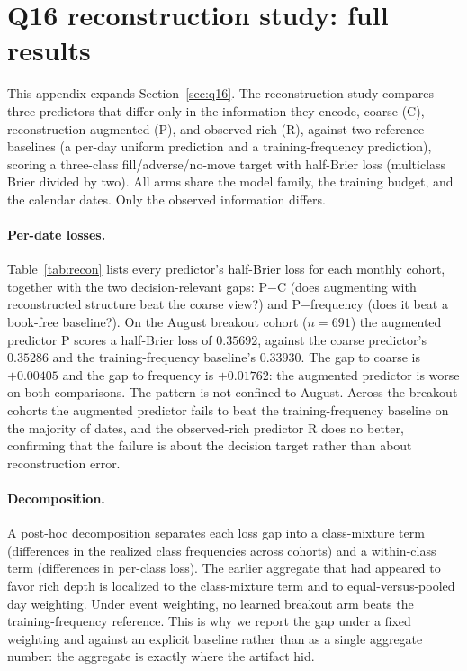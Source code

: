 \section{Q16 reconstruction study: full results}
\label{app:recon}

This appendix expands Section~\ref{sec:q16}. The reconstruction study compares three
predictors that differ only in the information they encode, coarse (C), reconstruction
augmented (P), and observed rich (R), against two reference baselines (a per-day uniform
prediction and a training-frequency prediction), scoring a three-class fill/adverse/no-move
target with half-Brier loss (multiclass Brier divided by two). All arms share the model
family, the training budget, and the calendar dates. Only the observed information differs.

\paragraph{Per-date losses.} Table~\ref{tab:recon} lists every predictor's half-Brier loss
for each monthly cohort, together with the two decision-relevant gaps: P$-$C (does
augmenting with reconstructed structure beat the coarse view?) and P$-$frequency (does it
beat a book-free baseline?). On the August breakout cohort ($n=691$) the augmented predictor P
scores a half-Brier loss of $0.35692$, against the coarse predictor's $0.35286$ and the
training-frequency baseline's $0.33930$. The gap to coarse is $+0.00405$ and the gap to
frequency is $+0.01762$: the augmented predictor is worse on both comparisons. The pattern is not confined to August. Across the
breakout cohorts the augmented predictor fails to beat the training-frequency baseline on
the majority of dates, and the observed-rich predictor R does no better, confirming that
the failure is about the decision target rather than about reconstruction error.



\paragraph{Decomposition.} A post-hoc decomposition separates each loss gap into a
class-mixture term (differences in the realized class frequencies across cohorts) and a
within-class term (differences in per-class loss). The earlier aggregate that had appeared
to favor rich depth is localized to the class-mixture term and to equal-versus-pooled
day weighting. Under event weighting, no learned breakout arm beats the training-frequency
reference. This is why we report the gap under a fixed weighting and against an explicit
baseline rather than as a single aggregate number: the aggregate is exactly where the
artifact hid.

